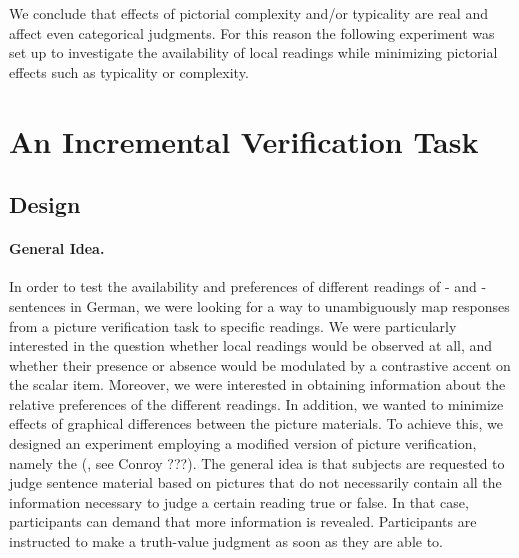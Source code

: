 \documentclass[fleqn,reqno,10pt,draft]{article}
\newcommand{\as}{\acro{as}}
\renewcommand{\es}{\acro{es}}
\begin{document}
We conclude that  effects of pictorial complexity and/or typicality are real and affect even categorical judgments. For this reason the following experiment was set up to investigate the availability of local readings while minimizing pictorial effects such as typicality or complexity. 




\section{An Incremental Verification Task}
\label{sec:exp}

\subsection{Design}
\label{sec:design}

\paragraph{General Idea.} In order to test the availability and
preferences of different readings of \as- and \es-sentences in German, 
we were looking for a way to unambiguously map responses from a picture
verification task to specific readings. We were particularly
interested in the question whether local readings would be observed at
all, and whether their presence or absence would be modulated by
a contrastive accent on the scalar item. Moreover, we were  
interested in obtaining information about the relative preferences 
of the different readings. In addition, we wanted
to minimize effects of graphical differences between the picture
materials. To achieve this, we designed an experiment employing a
modified version of picture verification, namely the
 (, see Conroy
???). The general idea is that subjects are requested to judge
sentence material based on pictures that do not necessarily contain
all the information necessary to judge a certain reading true or
false. In that case, participants can demand that more information is
revealed. Participants are instructed to make a truth-value judgment
as soon as they are able to.
\end{document}

